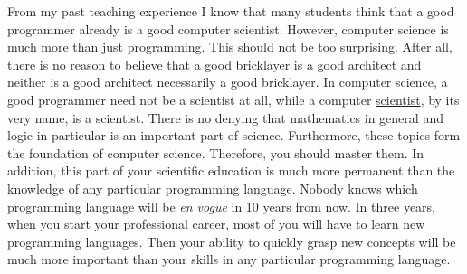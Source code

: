 From my past teaching experience I know that many students think that a good programmer already is a
good computer scientist.  However, computer science is much more than just programming.
This should not be too surprising.  After all, there is no reason to believe that a good bricklayer is a good
architect and neither is a good architect necessarily a good bricklayer.
In computer science, a good programmer need not be a scientist at all, while a
{\color{blue}computer \underline{scientist}}, by its very name, is a {\color{blue}scientist}.  
There is no denying that {\color{blue}mathematics} in general and 
{\color{blue}logic} in particular is an important part of science.  Furthermore, these topics form the
foundation of computer science.  Therefore, you should master them.  In addition, this
part of your scientific education is much more permanent than the knowledge of any particular programming
language.  Nobody knows which programming language will be \emph{en vogue} in 10 years from now.  In three 
years, when you start your professional career, most of you will have to learn new
programming languages.   Then your ability to quickly grasp new concepts will be much more important than your
skills in any particular programming language. 

